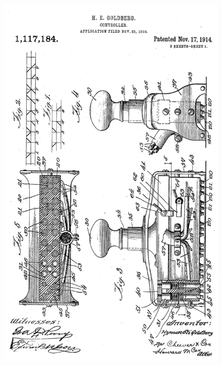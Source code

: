 \begin{figure}[htbp]
\begin{center}
\includegraphics[scale=0.3]{images/goldberg1.png}

\end{center}
\end{figure}
